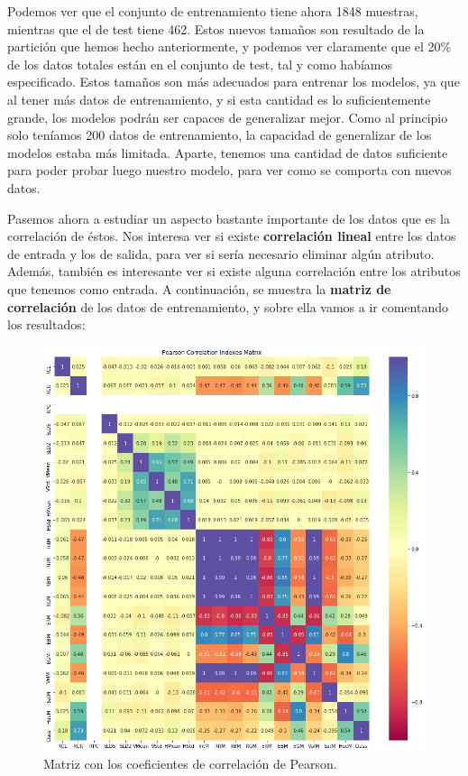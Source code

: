 \documentclass[11pt,a4paper]{article}
\begin{document}
Podemos ver que el conjunto de entrenamiento tiene ahora 1848 muestras, mientras que el de test tiene 462. Estos nuevos tamaños son
resultado de la partición que hemos hecho anteriormente, y podemos ver claramente que el 20\% de los datos totales están en el
conjunto de test, tal y como habíamos especificado. Estos tamaños son más adecuados para entrenar los modelos, ya que al tener más
datos de entrenamiento, y si esta cantidad es lo suficientemente grande, los modelos podrán ser capaces de generalizar mejor. Como
al principio solo teníamos 200 datos de entrenamiento, la capacidad de generalizar de los modelos estaba más limitada. Aparte, tenemos
una cantidad de datos suficiente para poder probar luego nuestro modelo, para ver como se comporta con nuevos datos.

Pasemos ahora a estudiar un aspecto bastante importante de los datos que es la correlación de éstos. Nos interesa ver si existe
\textbf{correlación lineal} entre los datos de entrada y los de salida, para ver si sería necesario eliminar algún atributo. Además, también es
interesante ver si existe alguna correlación entre los atributos que tenemos como entrada. A continuación, se muestra la \textbf{matriz de
correlación} de los datos de entrenamiento, y sobre ella vamos a ir comentando los resultados:

\begin{figure}[H]
    \centering
    \includegraphics[scale=0.4]{img/correlation.png}
    \caption{Matriz con los coeficientes de correlación de Pearson.}
    \label{fig:pearson}
\end{figure}
\end{document}
